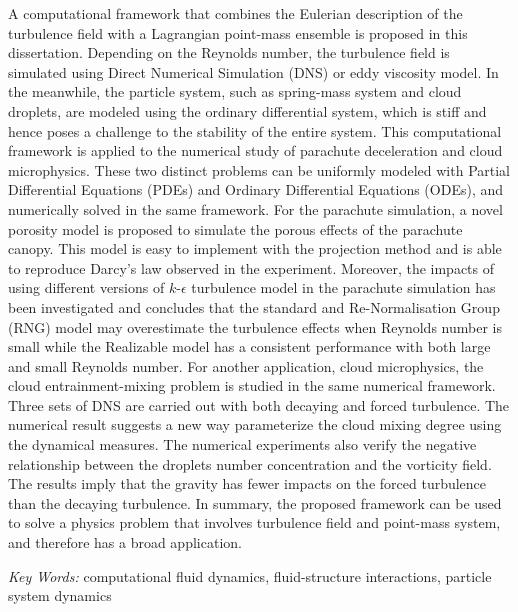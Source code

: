 A computational framework that combines the Eulerian description of the turbulence field with a Lagrangian point-mass ensemble is proposed in this dissertation. Depending on the Reynolds number, the turbulence field is simulated using Direct Numerical Simulation (DNS) or eddy viscosity model. In the meanwhile, the particle system, such as spring-mass system and cloud droplets, are modeled using the ordinary differential system, which is stiff and hence poses a challenge to the stability of the entire system. This computational framework is applied to the numerical study of parachute deceleration and cloud microphysics. These two distinct problems can be uniformly modeled with Partial Differential Equations (PDEs) and Ordinary Differential Equations (ODEs), and numerically solved in the same framework. For the parachute simulation, a novel porosity model is proposed to simulate the porous effects of the parachute canopy. This model is easy to implement with the projection method and is able to reproduce Darcy's law observed in the experiment. Moreover, the impacts of using different versions of $k$-$\epsilon$ turbulence model in the parachute simulation has been investigated and concludes that the standard and Re-Normalisation Group (RNG) model may overestimate the turbulence effects when Reynolds number is small while the Realizable model has a consistent performance with both large and small Reynolds number. For another application, cloud microphysics, the cloud entrainment-mixing problem is studied in the same numerical framework. Three sets of DNS are carried out with both decaying and forced turbulence. The numerical result suggests a new way parameterize the cloud mixing degree using the dynamical measures. The numerical experiments also verify the negative relationship between the droplets number concentration and the vorticity field. The results imply that the gravity has fewer impacts on the forced turbulence than the decaying turbulence. In summary, the proposed framework can be used to solve a physics problem that involves turbulence field and point-mass system, and therefore has a broad application.

{\it Key Words:} computational fluid dynamics, fluid-structure interactions, particle system dynamics

